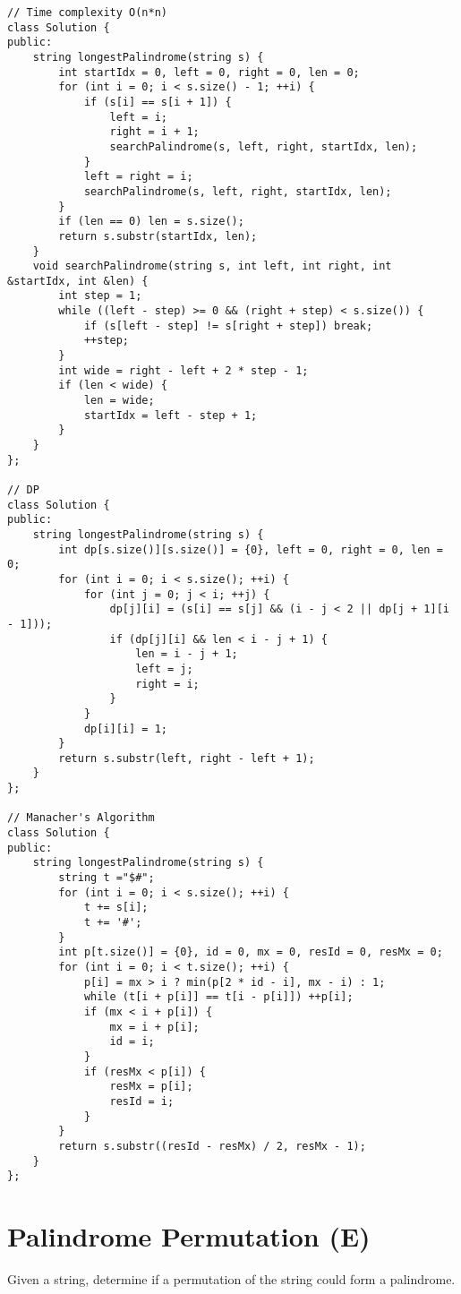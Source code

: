 \begin{lstlisting}
// Time complexity O(n*n)
class Solution {
public:
    string longestPalindrome(string s) {
        int startIdx = 0, left = 0, right = 0, len = 0;
        for (int i = 0; i < s.size() - 1; ++i) {
            if (s[i] == s[i + 1]) {
                left = i;
                right = i + 1;
                searchPalindrome(s, left, right, startIdx, len);
            }
            left = right = i;
            searchPalindrome(s, left, right, startIdx, len);
        }
        if (len == 0) len = s.size();
        return s.substr(startIdx, len);
    }
    void searchPalindrome(string s, int left, int right, int &startIdx, int &len) {
        int step = 1;
        while ((left - step) >= 0 && (right + step) < s.size()) {
            if (s[left - step] != s[right + step]) break;
            ++step;
        }
        int wide = right - left + 2 * step - 1;
        if (len < wide) {
            len = wide;
            startIdx = left - step + 1;
        }
    }
};

// DP
class Solution {
public:
    string longestPalindrome(string s) {
        int dp[s.size()][s.size()] = {0}, left = 0, right = 0, len = 0;
        for (int i = 0; i < s.size(); ++i) {
            for (int j = 0; j < i; ++j) {
                dp[j][i] = (s[i] == s[j] && (i - j < 2 || dp[j + 1][i - 1]));
                if (dp[j][i] && len < i - j + 1) {
                    len = i - j + 1;
                    left = j;
                    right = i;
                }
            }
            dp[i][i] = 1;
        }
        return s.substr(left, right - left + 1);
    }
};

// Manacher's Algorithm
class Solution {
public:
    string longestPalindrome(string s) {
        string t ="$#";
        for (int i = 0; i < s.size(); ++i) {
            t += s[i];
            t += '#';
        }
        int p[t.size()] = {0}, id = 0, mx = 0, resId = 0, resMx = 0;
        for (int i = 0; i < t.size(); ++i) {
            p[i] = mx > i ? min(p[2 * id - i], mx - i) : 1;
            while (t[i + p[i]] == t[i - p[i]]) ++p[i];
            if (mx < i + p[i]) {
                mx = i + p[i];
                id = i;
            }
            if (resMx < p[i]) {
                resMx = p[i];
                resId = i;
            }
        }
        return s.substr((resId - resMx) / 2, resMx - 1);
    }
};
\end{lstlisting}


\section{Palindrome Permutation (E)}
Given a string, determine if a permutation of the string could form a palindrome.\\

